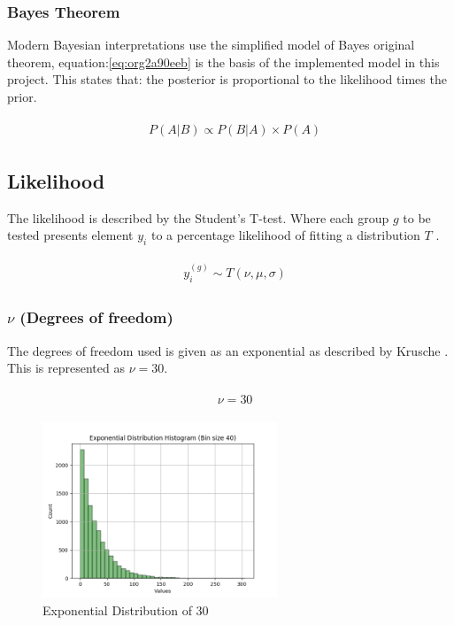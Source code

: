 \documentclass[11pt]{report}
\begin{document}
\subsubsection{Bayes Theorem}
\label{sec:orgfb13763}

Modern Bayesian interpretations use the simplified model of Bayes original theorem, equation:\ref{eq:org2a90eeb} is the basis of the implemented model in this project. This states that: the posterior is proportional to the likelihood times the prior.

\begin{align}
\label{eq:org2a90eeb}
  &\begin{aligned}
  P(A|B) \propto P(B|A) \times P(A)
  \end{aligned}
\end{align}


\subsection{Likelihood}
\label{sec:org1c710ac}
The likelihood is described by the Student's T-test. Where each group \(g\) to be tested presents element \(y_i\) to a percentage likelihood of fitting a distribution \(T\) .

 \begin{align}
\label{eq:org1a91b55}
   &\begin{aligned}
y_i^{(g)} \sim T(\nu, \mu, \sigma)
   \end{aligned}
 \end{align}

\subsubsection{\(\nu\) (Degrees of freedom)}
\label{sec:org771eb6b}
The degrees of freedom used is given as an exponential as described by
Krusche \cite{Kruschke2012}. This is represented as \(\nu = 30\).

 \begin{align}
\label{eq:org2633e50}
   &\begin{aligned}
\nu = 30
   \end{aligned}
 \end{align}

\begin{figure}[htbp]
\centering
\includegraphics[width=7cm]{./images/dist2.png}
\caption{\label{fig:orge6330f4}
Exponential Distribution of 30}
\end{figure}
\end{document}
